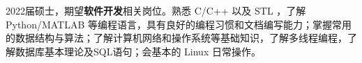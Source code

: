 {\onehalfspacing\hspace{2em}%
2022届硕士，期望\textbf{软件开发}相关岗位。熟悉 C/C++ 以及 STL ，了解 Python/MATLAB 等编程语言，具有良好的编程习惯和文档编写能力；掌握常用的数据结构与算法；了解计算机网络和操作系统等基础知识，了解多线程编程，了解数据库基本理论及SQL语句；会基本的 Linux 日常操作。
\par}